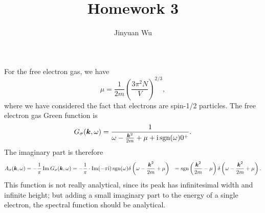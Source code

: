 \documentclass[hyperref, a4paper]{article}
\title{Homework 3}
\author{Jinyuan Wu}
\DeclareMathOperator{\sgn}{sgn}
\newcommand*{\ii}{\mathrm{i}}
\def\\{}%
\begin{document}
\maketitle

\section{}

\subsection{}

For the free electron gas, we have 
\begin{equation}
    \mu = \frac{1}{2m} \left(\frac{3 \pi^2 N}{V}\right)^{2/3},
\end{equation}
where we have considered the fact that electrons are spin-1/2 particles.
The free electron gas Green function is 
\begin{equation}
    G_{\sigma}(\vb*{k}, \omega) = \frac{1}{\omega - \frac{\vb*{k}^2}{2m} + \mu + \ii \sgn(\omega) 0^+}.
\end{equation}
The imaginary part is therefore 
\begin{equation}
    \begin{aligned}
        A_\sigma(\vb*{k}, \omega) &= - \frac{1}{\pi} \Im G_{\sigma}(\vb*{k}, \omega)
        = - \frac{1}{\pi} \cdot \Im (- \pi \ii) \sgn (\omega) \delta\left(
            \omega - \frac{\vb*{k}^2}{2m} + \mu
        \right) \\
        &= \sgn\left(
            \frac{\vb*{k}^2}{2m} - \mu
        \right) \delta\left(
            \omega - \frac{\vb*{k}^2}{2m} + \mu
        \right).
    \end{aligned}
\end{equation}
This function is not really analytical, 
since its peak has infinitesimal width 
and infinite height; 
but adding a small imaginary part to the energy of a single electron,
the spectral function should be analytical.

\subsection{}
\end{document}
